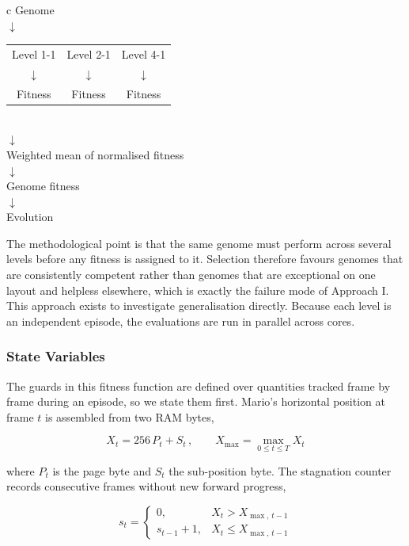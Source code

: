 \begin{center}
\begin{tabular}{c}
Genome \\
$\downarrow$ \\
\begin{tabular}{@{}ccc@{}}
Level 1-1 & Level 2-1 & Level 4-1 \\
$\downarrow$ & $\downarrow$ & $\downarrow$ \\
Fitness & Fitness & Fitness \\
\end{tabular} \\
$\downarrow$ \\
Weighted mean of normalised fitness \\
$\downarrow$ \\
Genome fitness \\
$\downarrow$ \\
Evolution \\
\end{tabular}
\end{center}

\noindent
The methodological point is that the same genome must perform across several
levels before any fitness is assigned to it. Selection therefore favours
genomes that are consistently competent rather than genomes that are
exceptional on one layout and helpless elsewhere, which is exactly the failure
mode of Approach I. This approach exists to investigate generalisation
directly. Because each level is an independent episode, the evaluations are
run in parallel across cores.

\subsubsection{State Variables}

The guards in this fitness function are defined over quantities tracked frame
by frame during an episode, so we state them first. Mario's horizontal
position at frame $t$ is assembled from two RAM bytes,

\begin{equation}
    X_t = 256\,P_t + S_t\,, \qquad
    X_{\max} = \max_{0 \leq t \leq T} X_t
    \label{eq:mario-x}
\end{equation}

\noindent
where $P_t$ is the page byte and $S_t$ the sub-position byte. The stagnation
counter records consecutive frames without new forward progress,

\begin{equation}
    s_t =
    \begin{cases}
        0, & X_t > X_{\max,\,t-1} \\
        s_{t-1} + 1, & X_t \leq X_{\max,\,t-1}
    \end{cases}
    \label{eq:stagnation}
\end{equation}


